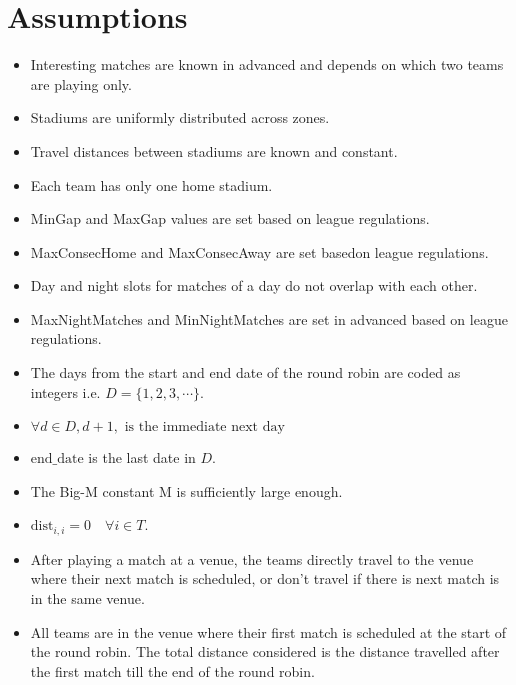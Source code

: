 \documentclass[a4paper, 12pt]{article}
\begin{document}
\section*{Assumptions}
\begin{itemize}
    \item Interesting matches are known in advanced and depends on which two teams are playing only.
    \item Stadiums are uniformly distributed across zones.
    \item Travel distances between stadiums are known and constant.
    \item Each team has only one home stadium.
    \item MinGap and MaxGap values are set based on league regulations.
    \item MaxConsecHome and MaxConsecAway are set basedon league regulations.
    \item Day and night slots for matches of a day do not overlap with each other.
    \item MaxNightMatches and MinNightMatches are set in advanced based on league regulations.
    \item The days from the start and end date of the round robin are coded as integers i.e. $D = \{1,2,3, \cdots \}$.
    \item $\forall d \in D, d+1, \text{ is the immediate next day}$ 
    \item $\text{end\_date}$ is the last date in $D$.
    \item The Big-M constant M is sufficiently large enough.
    \item $\text{dist}_{i,i} = 0 \quad \forall i \in T$.
    \item After playing a match at a venue, the teams directly travel to the venue where their next match is scheduled, or don't travel if there is next match is in the same venue.
    \item All teams are in the venue where their first match is scheduled at the start of the round robin. The total distance considered is the distance travelled after the first match till the end of the round robin. 
\end{itemize}




\end{document}
